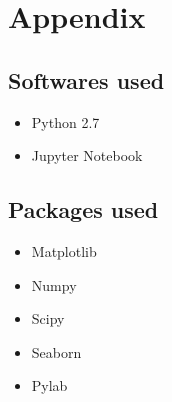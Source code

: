 \documentclass[11pt,a4paper]{article}
\begin{document}
\section{Appendix}
\subsection{Softwares used}
\begin{itemize}
\item Python 2.7
\item Jupyter Notebook
\end{itemize}

\subsection{Packages used}
\begin{itemize}
\item Matplotlib
\item Numpy
\item Scipy
\item Seaborn
\item Pylab
\end{itemize}
\end{document}

